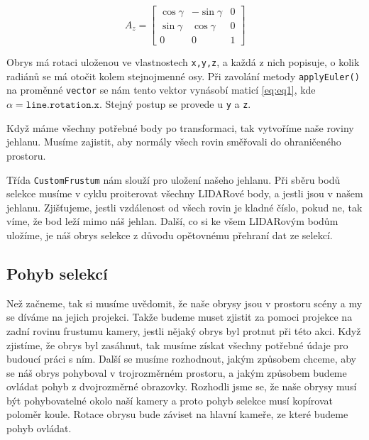 \documentclass[czech,bachelor,dept420,male,cpdeclaration]{diploma}
\begin{document}
\begin{equation}
		A_z =
		\begin{bmatrix}%
    \cos \gamma & -\sin \gamma & 0 \\
		\sin \gamma & \cos \gamma & 0 \\ 
		0 & 0 & 1
    \end{bmatrix}
\label{eq:eq3}
\end{equation}

Obrys má rotaci uloženou ve vlastnostech \texttt{x,y,z}, a každá z nich popisuje, o kolik radiánů se má otočit kolem stejnojmenné osy. Při zavolání metody \texttt{applyEuler()} na proměnné \texttt{vector} se nám tento vektor vynásobí maticí \eqref{eq:eq1}, kde $ \alpha = \texttt{line.rotation.x} $. Stejný postup se provede u \texttt{y} a \texttt{z}.  

Když máme všechny potřebné body po transformaci, tak vytvoříme naše roviny jehlanu. Musíme zajistit, aby normály všech rovin směřovali do ohraničeného prostoru. 

 

Třída \texttt{CustomFrustum} nám slouží pro uložení našeho jehlanu. Při sběru bodů selekce musíme v cyklu proiterovat všechny LIDARové body, a jestli jsou v našem jehlanu. Zjišťujeme, jestli vzdálenost od všech rovin je kladné číslo, pokud ne, tak víme, že bod leží mimo náš jehlan. Další, co si ke všem LIDARovým bodům uložíme, je náš obrys selekce z důvodu opětovnému přehraní dat ze selekcí.



\subsection{Pohyb selekcí} 
Než začneme, tak si musíme uvědomit, že naše obrysy jsou v prostoru scény a my se díváme na jejich projekci. Takže budeme muset zjistit za pomoci projekce na zadní rovinu frustumu kamery, jestli nějaký obrys byl protnut při této akci. Když zjistíme, že obrys byl zasáhnut, tak musíme získat všechny potřebné údaje pro budoucí práci s ním. Další se musíme rozhodnout, jakým způsobem chceme, aby se náš obrys pohyboval v trojrozměrném prostoru, a jakým způsobem budeme ovládat pohyb z dvojrozměrné obrazovky. Rozhodli jsme se, že naše obrysy musí být pohybovatelné okolo naší kamery a proto pohyb selekce musí kopírovat poloměr koule. Rotace obrysu bude záviset na hlavní kameře, ze které budeme pohyb ovládat.
\end{document}
